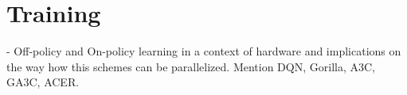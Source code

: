 \section{Training}

- Off-policy and On-policy learning in a context of hardware and implications
  on the way how this schemes can be parallelized.
  Mention DQN, Gorilla, A3C, GA3C, ACER.
